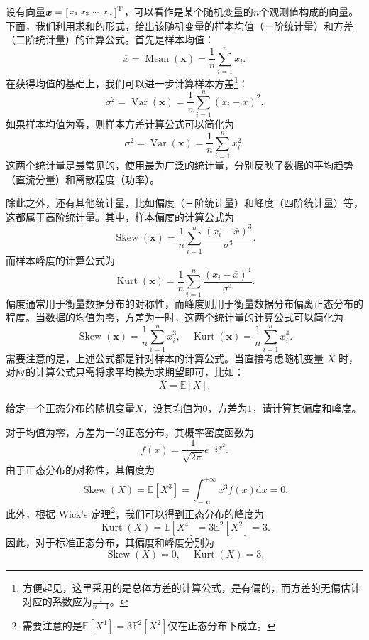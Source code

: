 设有向量\( \boldsymbol{x} = \begin{bsmallmatrix} x_1 & x_2 & \cdots & x_n \end{bsmallmatrix}^{\mathrm{T}} \)，可以看作是某个随机变量的\( n \)个观测值构成的向量。下面，我们利用求和的形式，给出该随机变量的样本均值（一阶统计量）和方差（二阶统计量）的计算公式。首先是样本均值：
\[
    \overline{x} = \operatorname{Mean}(\bm{x}) = \frac{1}{n} \sum_{i=1}^n x_i.
\]
在获得均值的基础上，我们可以进一步计算样本方差\footnote{方便起见，这里采用的是总体方差的计算公式，是有偏的，而方差的无偏估计对应的系数应为\( \frac{1}{n-1} \)。}：
\[
    \sigma^2 = \operatorname{Var}(\bm{x}) = \frac{1}{n} \sum_{i=1}^n (x_i - \bar{x})^2.
\]
如果样本均值为零，则样本方差计算公式可以简化为
\[
    \sigma^2 = \operatorname{Var}(\bm{x}) =  \frac{1}{n} \sum_{i=1}^n x_i^2.
\]
这两个统计量是最常见的，使用最为广泛的统计量，分别反映了数据的平均趋势（直流分量）和离散程度（功率）。

除此之外，还有其他统计量，比如偏度（三阶统计量）和峰度（四阶统计量）等，这都属于高阶统计量。其中，样本偏度的计算公式为
\[
    \operatorname{Skew}(\bm{x}) = \frac{1}{n} \sum_{i=1}^n \frac{(x_i - \bar{x})^3}{\sigma^3}.
\]
而样本峰度的计算公式为
\[
    \operatorname{Kurt}(\bm{x}) = \frac{1}{n} \sum_{i=1}^n \frac{(x_i - \bar{x})^4}{\sigma^4}.
\]
偏度通常用于衡量数据分布的对称性，而峰度则用于衡量数据分布偏离正态分布的程度。当数据的均值为零，方差为一时，这两个统计量的计算公式可以简化为
\[
    \operatorname{Skew}(\bm{x}) = \frac{1}{n} \sum_{i=1}^n x_i^3, \quad \operatorname{Kurt}(\bm{x}) = \frac{1}{n} \sum_{i=1}^n x_i^4.
\]
需要注意的是，上述公式都是针对样本的计算公式。当直接考虑随机变量 \( X \) 时，对应的计算公式只需将求平均换为求期望即可，比如：
\[
    \overline{X} = \mathbb{E}[X].
\]

\begin{example}
    给定一个正态分布的随机变量\( X \)，设其均值为\( 0 \)，方差为\( 1 \)，请计算其偏度和峰度。
\end{example}
\begin{solution}
    对于均值为零，方差为一的正态分布，其概率密度函数为
    \[
        f(x) = \frac{1}{\sqrt{2\pi}} e^{-\frac{1}{2}x^2}.
    \]
    由于正态分布的对称性，其偏度为
    \[
        \operatorname{Skew}(X) = \mathbb{E}\left[X^3\right] = \int_{-\infty}^{+\infty} x^3 f(x) \mathrm{d}x = 0.
    \]
    此外，根据 Wick's 定理\footnote{需要注意的是\( \mathbb{E}\left[X^4\right] = 3 \mathbb{E}^2\left[ X^2 \right] \)仅在正态分布下成立。}，我们可以得到正态分布的峰度为
    \[
        \operatorname{Kurt}(X) = \mathbb{E}\left[X^4\right] = 3 \mathbb{E}^2\left[ X^2 \right] = 3.
    \]
    因此，对于标准正态分布，其偏度和峰度分别为
    \[
        \operatorname{Skew}(X) = 0, \quad \operatorname{Kurt}(X) = 3.
    \]
\end{solution}

